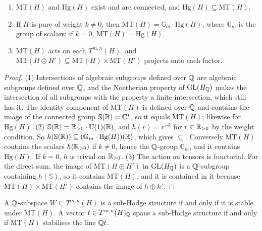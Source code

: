 \begin{proposition}\label{mumford-tate:proposition-basic}
\begin{enumerate}
\item $\mathrm{MT}(H)$ and $\mathrm{Hg}(H)$ exist and are connected, and $\mathrm{Hg}(H) \subseteq \mathrm{MT}(H)$.
\item If $H$ is pure of weight $k \neq 0$, then $\mathrm{MT}(H) = \mathbb{G}_m \cdot \mathrm{Hg}(H)$, where $\mathbb{G}_m$ is the group of scalars; if $k = 0$, $\mathrm{MT}(H) = \mathrm{Hg}(H)$.
\item $\mathrm{MT}(H)$ acts on each $T^{m,n}(H)$, and $\mathrm{MT}(H \oplus H') \subseteq \mathrm{MT}(H) \times \mathrm{MT}(H')$ projects onto each factor.
\end{enumerate}
\end{proposition}

\begin{proof}
(1) Intersections of algebraic subgroups defined over $\mathbb{Q}$ are algebraic subgroups defined over $\mathbb{Q}$, and the Noetherian property of $\mathrm{GL}(H_{\mathbb{Q}})$ makes the intersection of all
subgroups with the property a finite intersection, which still has it. The identity component of $\mathrm{MT}(H)$ is defined over $\mathbb{Q}$ and contains the image of the connected group
$\mathbb{S}(\mathbb{R}) = \mathbb{C}^*$, so it equals $\mathrm{MT}(H)$; likewise for $\mathrm{Hg}(H)$. (2) $\mathbb{S}(\mathbb{R}) = \mathbb{R}_{>0} \cdot \mathbb{U}(1)(\mathbb{R})$, and $h(r) = r^{-k}$ for $r \in \mathbb{R}_{>0}$ by the
weight condition. So $h(\mathbb{S}(\mathbb{R})) \subseteq (\mathbb{G}_m \cdot \mathrm{Hg}(H))(\mathbb{R})$, which gives $\subseteq$. Conversely $\mathrm{MT}(H)$ contains the scalars $h(\mathbb{R}_{>0})$ if $k \neq 0$,
hence the $\mathbb{Q}$-group $\mathbb{G}_m$, and it contains $\mathrm{Hg}(H)$. If $k = 0$, $h$ is trivial on $\mathbb{R}_{>0}$. (3) The action on tensors is functorial. For the direct sum, the image of
$\mathrm{MT}(H \oplus H')$ in $\mathrm{GL}(H_{\mathbb{Q}})$ is a $\mathbb{Q}$-subgroup containing $h(\mathbb{S})$, so it contains $\mathrm{MT}(H)$, and it is contained in it because
$\mathrm{MT}(H) \times \mathrm{MT}(H')$ contains the image of $h \oplus h'$.
\end{proof}

\begin{theorem}\label{mumford-tate:theorem-sub-hodge}
A $\mathbb{Q}$-subspace $W \subseteq T^{m,n}(H)$ is a sub-Hodge structure if and only if it is stable under $\mathrm{MT}(H)$. A vector $t \in T^{m,n}(H)_{\mathbb{Q}}$ spans a sub-Hodge structure if and only if
$\mathrm{MT}(H)$ stabilises the line $\mathbb{Q} t$.
\end{theorem}

